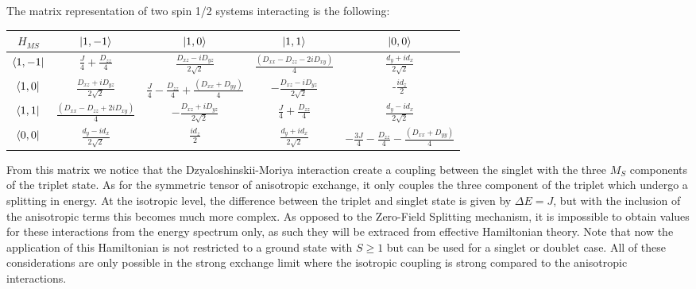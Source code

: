\documentclass[10pt]{report}
\numberwithin{equation}{section}
\begin{document}
The matrix representation of two spin 1/2 systems interacting is the following:
\begin{center}
    \begin{tabular}{c | c c c c}
        $H_{MS}$ & $\ket{1,-1}$ & $\ket{1,0}$ & $\ket{1,1}$ & $\ket{0,0}$\\
        \hline
        $\bra{1,-1}$ & $\frac{J}{4}+\frac{D_{zz}}{4}$ & $\frac{D_{xz}-iD_{yz}}{2\sqrt{2}}$ & $\frac{(D_{xx}-D_{zz}-2iD_{xy})}{4} $& $\frac{d_y+id_x}{2\sqrt{2}}$\\
        $\bra{1,0}$ & $\frac{D_{xz}+iD_{yz}}{2\sqrt{2}}$ &$ \frac{J}{4} -\frac{D_{zz}}{4} +\frac{(D_{xx}+D_{yy})}{4}$& $-\frac{D_{xz}-iD_{yz}}{2\sqrt{2}}$ & -$\frac{id_z}{2}$ \\
        $\bra{1,1}$ &$\frac{(D_{xx}-D_{zz}+2iD_{xy})}{4} $ & $-\frac{D_{xz}+iD_{yz}}{2\sqrt{2}}$ & $\frac{J}{4}+\frac{D_{zz}}{4}$ & $\frac{d_y-id_x}{2\sqrt{2}}$\\
        $\bra{0,0}$ & $\frac{d_y-id_x}{2\sqrt{2}}$  & $\frac{id_z}{2}$  &$\frac{d_y+id_x}{2\sqrt{2}}$  & $-\frac{3J}{4}-\frac{D_{zz}}{4}-\frac{(D_{xx}+D_{yy})}{4}$\\
    \end{tabular}
\end{center}
From this matrix we notice that the Dzyaloshinskii-Moriya interaction create a coupling between the singlet with the three $M_S$ components of the triplet state.
As for the symmetric tensor of anisotropic exchange, it only couples the three component of the triplet which undergo a splitting in energy.
At the isotropic level, the difference between the triplet and singlet state is given by $\Delta E=J$, but with the inclusion of the anisotropic terms this becomes much more complex. 
As opposed to the Zero-Field Splitting mechanism, it is impossible to obtain values for these interactions from the energy spectrum only, as such they will be extraced from effective Hamiltonian theory.
Note that now the application of this Hamiltonian is not restricted to a ground state with $S\ge1$ but can be used for a singlet or doublet case.
All of these considerations are only possible in the strong exchange limit where the isotropic coupling is strong compared to the anisotropic interactions.

\end{document}
